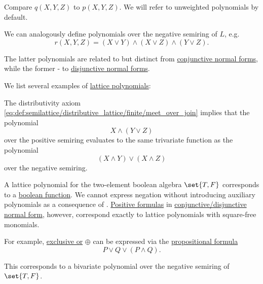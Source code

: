 \begin{remark}
  Compare \( q(X, Y, Z) \) to \( p(X, Y, Z) \). We will refer to unweighted polynomials by default.

  We can analogously define polynomials over the negative semiring of \( L \), e.g.
  \begin{equation*}
    r(X, Y, Z) = (X \vee Y) \wedge (X \vee Z) \wedge (Y \vee Z).
  \end{equation*}

  The latter polynomials are related to but distinct from \hyperref[def:cnf_and_dnf]{conjunctive normal forms}, while the former - to \hyperref[def:cnf_and_dnf]{disjunctive normal forms}.
\end{remark}

\begin{example}\label{ex:lattice_polynomials}
  We list several examples of \hyperref[rem:lattice_polynomials]{lattice polynomials}:
  \begin{thmenum}
     The distributivity axiom \eqref{eq:def:semilattice/distributive_lattice/finite/meet_over_join} implies that the polynomial
    \begin{equation*}
      X \wedge (Y \vee Z)
    \end{equation*}
    over the positive semiring evaluates to the same trivariate function as the polynomial
    \begin{equation*}
      (X \wedge Y) \vee (X \wedge Z)
    \end{equation*}
    over the negative semiring.

     A lattice polynomial for the two-element boolean algebra \hyperref[def:boolean_value]{\( \set{ T, F } \)} corresponds to a \hyperref[def:boolean_function]{boolean function}. We cannot express negation without introducing auxiliary polynomials as a consequence of . \hyperref[def:positive_formula]{Positive formulas} in \hyperref[def:cnf_and_dnf]{conjunctive/disjunctive normal form}, however, correspond exactly to lattice polynomials with square-free monomials.

    For example, \hyperref[def:standard_boolean_operators]{exclusive or} \( \oplus \) can be expressed via the \hyperref[def:propositional_syntax/formula]{propositional formula}
    \begin{equation*}
      P \vee Q \vee (P \wedge Q).
    \end{equation*}

    This corresponds to a bivariate polynomial over the negative semiring of \( \set{ T, F } \).
  \end{thmenum}
\end{example}

